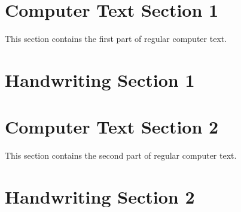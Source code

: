 \documentclass[12pt]{article}
\newcounter{ct}
\begin{document}
\section*{Computer Text Section 1}
This section contains the first part of regular computer text.

\section*{Handwriting Section 1}
{\openup 0.8cm
\noindent %
}

\section*{Computer Text Section 2}
This section contains the second part of regular computer text.

\section*{Handwriting Section 2}
{\openup 0.8cm
\noindent %
}
\end{document}
